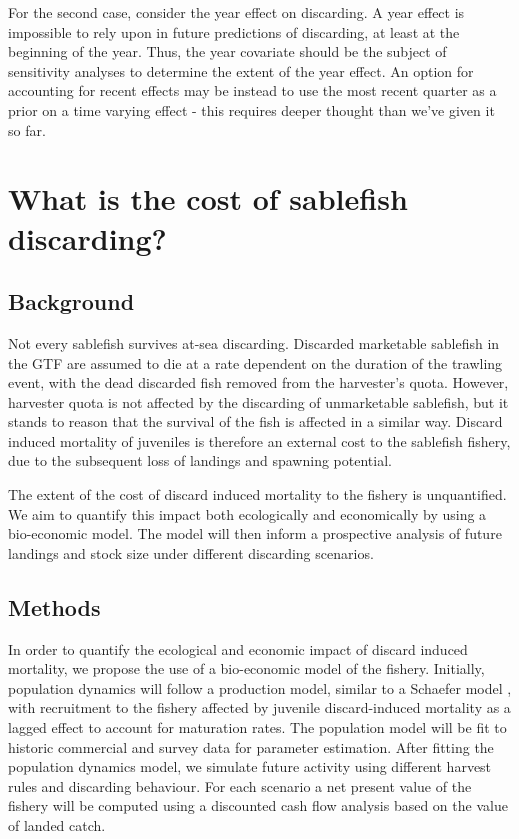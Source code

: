 \documentclass{article}
\begin{document}
For the second case, consider the year effect on discarding. A year effect is impossible to rely upon in future predictions of discarding, at least at the beginning of the year. Thus, the year covariate should be the subject of sensitivity analyses to determine the extent of the year effect. An option for accounting for recent effects may be instead to use the most recent quarter as a prior on a time varying effect - this requires deeper thought than we've given it so far.


\section{What is the cost of sablefish discarding?}\label{sec:economics}
    
\subsection{Background}

Not every sablefish survives at-sea discarding. Discarded marketable sablefish in the GTF are assumed to die at a rate dependent on the duration of the trawling event, with the dead discarded fish removed from the harvester's quota. However, harvester quota is not affected by the discarding of unmarketable sablefish, but it stands to reason that the survival of the fish is affected in a similar way. Discard induced mortality of juveniles is therefore an external cost to the sablefish fishery, due to the subsequent loss of landings and spawning potential.

The extent of the cost of discard induced mortality to the fishery is unquantified. We aim to quantify this impact both ecologically and economically by using a bio-economic model. The model will then inform a prospective analysis of future landings and stock size under different discarding scenarios.

\subsection{Methods}

In order to quantify the ecological and economic impact of discard induced mortality, we propose the use of a bio-economic model of the fishery. Initially, population dynamics will follow a production model, similar to a Schaefer model \citep{schaefer1957some}, with recruitment to the fishery affected by juvenile discard-induced mortality as a lagged effect to account for maturation rates. The population model will be fit to historic commercial and survey data for parameter estimation. After fitting the population dynamics model, we simulate future activity using different harvest rules and discarding behaviour. For each scenario a net present value of the fishery will be computed using a discounted cash flow analysis based on the value of landed catch.
\end{document}
